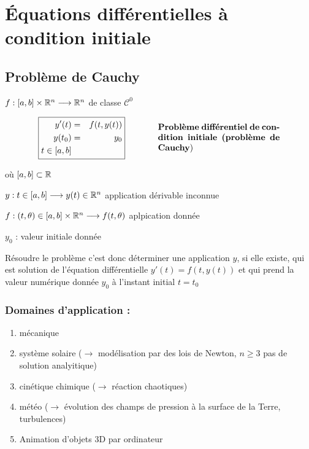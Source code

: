 \chapter{Équations différentielles à condition initiale}

\section{Problème de Cauchy}

$f : [a,b] \times \mathbb{R}^n \longrightarrow \mathbb{R}^n$ de classe $\mathcal{C}^0$

\begin{equation*}
    \begin{array}{cc}
        \boxed{\begin{aligned}
            y'(t)  & = & f(t,y(t)) \\
            y(t_0) & = & y_0 \\
            t \in [a,b]
        \end{aligned}}
        & \hspace{1cm}
        \parbox{5cm}{\textbf{Problème différentiel de condition initiale (problème de Cauchy})}
    \end{array}
\end{equation*}

où $[a,b] \subset \mathbb{R}$

\hspace{0.5cm} $y : t \in [a,b] \longrightarrow y(t) \in \mathbb{R}^n$ application dérivable inconnue

\hspace{0.5cm} $f : (t, \theta) \in [a,b] \times \mathbb{R}^n \longrightarrow f(t,\theta)$ aplpication donnée

\hspace{0.5cm} $y_0$ : valeur initiale donnée


Résoudre le problème c'est donc déterminer une application $y$, si elle existe, qui est solution de 
l'équation différentielle $y'(t) = f(t,y(t))$ et qui prend la valeur numérique donnée 
$y_0$ à l'instant initial $t=t_0$

\subsection*{Domaines d'application :}
\begin{enumerate}[label=-]
    \item mécanique
    \item système solaire ($\to$ modélisation par des lois de Newton, $n \geq 3$ pas de solution analyitique)
    \item cinétique chimique ($\to$ réaction chaotiques)
    \item météo ($\to$ évolution des champs de pression à la surface de la Terre, turbulences)
    \item Animation d'objets 3D par ordinateur
\end{enumerate}

